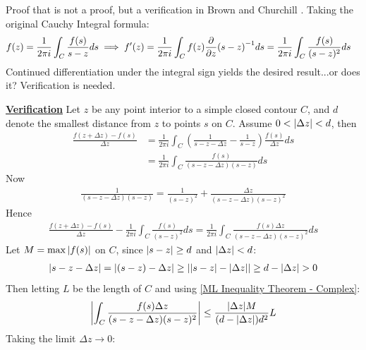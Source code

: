 \documentclass[12pt, english]{book}
\makeatletter
\renewenvironment{proof}[1][\proofname]{\par
	\pushQED{\qed}%
	\normalfont \topsep6\p@\@plus6\p@\relax
	\list{}{%
		\settowidth{\leftmargin}{\itshape\proofname:\hskip\labelsep}%
		\setlength{\labelwidth}{0pt}%
		\setlength{\itemindent}{-\leftmargin}%
	}%
	\item[\hskip\labelsep\itshape#1\@addpunct{:}]\ignorespaces
	}{ \popQED\endlist\@endpefalse}
\makeatother
\begin{document}
	\begin{proof}
		Proof that is not a proof, but a verification in Brown and Churchill \cite{Brown.J;Churchill.R-Complex-Variables-2014}. \newline
		Taking the original Cauchy Integral formula:
		\begin{align*}
			f(z) = \frac{1}{2\pi i} \int_{C} \frac{f(s)}{s-z} ds
			&\implies f'(z) = \frac{1}{2\pi i} \int_{C} f(z) \pdv{z}(s-z)^{-1} ds = \frac{1}{2\pi i} \int_{C} \frac{f(s)}{(s-z)^2} ds
		\end{align*}
		Continued differentiation under the integral sign yields the desired result...or does it? Verification is needed. 
		
		\underline{\textbf{Verification}} \newline
		Let \(z\) be any point interior to a simple closed contour \(C\), and \(d\) denote the smallest distance from \(z\) to points \(s\) on \(C\). Assume \(0 < \abs{\Delta z} < d\), then 
		\begin{align*}
			\frac{f(z + \Delta z) - f(s)}{\Delta z} 
			&= \frac{1}{2 \pi i} \int_{C} \left(\frac{1}{s - z - \Delta z} - \frac{1}{s - z}\right) \frac{f(s)}{\Delta z} ds \\
			&= \frac{1}{2\pi i} \int_{C} \frac{f(s)}{(s - z - \Delta z)(s-z)} ds
		\end{align*}
		Now
		\begin{align*}
			\frac{1}{(s-z-\Delta z)(s-z)} = \frac{1}{(s-z)^2} + \frac{\Delta z}{(s-z-\Delta z)(s-z)^2}
		\end{align*}
		Hence
		\begin{align*}
			\frac{f(z + \Delta z) - f(s)}{\Delta z} - \frac{1}{2\pi i} \int_{C} \frac{f(s)}{(s-z)^2} ds = \frac{1}{2\pi i} \int_{C} \frac{f(s)\Delta z}{(s-z-\Delta z)(s-z)^2} ds
		\end{align*}
		Let \(M = \max{\abs{f(s)}}\) on \(C\), since \(\abs{s-z} \geq d\) and \(\abs{\Delta z}<d\):
		\begin{align*}
			\abs{s-z-\Delta z} = \abs{(s-z) - \Delta z} \geq \abs{\abs{s-z} - \abs{\Delta z}} \geq d - \abs{\Delta z} > 0
		\end{align*}
		Then letting \(L\) be the length of \(C\) and using \cref{ML Inequality Theorem - Complex}:
		\begin{align*}
			\abs{\int_{C} \frac{f(s) \Delta z}{(s-z-\Delta z)(s-z)^2}} 
			\leq \frac{\abs{\Delta z} M}{(d - \abs{\Delta z}) d^2} L
		\end{align*}
		Taking the limit \(\Delta z \rightarrow 0\):
		\begin{align*}

\end{align*}
\end{proof}
\end{document}
